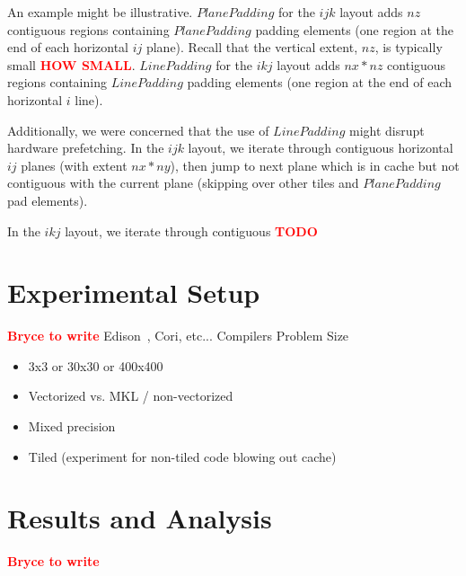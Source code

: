 \documentclass[conference]{IEEEtran}
\newcommand{\fix}[1]{{\bf \textcolor {red}{#1}}}
\begin{document}
An example might be illustrative. \(PlanePadding\) for the \(ijk\) layout adds
\(nz\) contiguous regions containing \(PlanePadding\) padding elements (one region
at the end of each horizontal \(ij\) plane). Recall that the vertical extent, \(nz\), 
is typically small \fix{HOW SMALL}. \(LinePadding\) for the \(ikj\) layout adds
\(nx*nz\) contiguous regions containing \(LinePadding\) padding elements (one region
at the end of each horizontal \(i\) line).

Additionally, we were concerned that the use of \(LinePadding\) might disrupt
hardware prefetching. In the \(ijk\) layout, we iterate through contiguous
horizontal \(ij\) planes (with extent \(nx*ny\)), then jump to next plane which
is in cache but not contiguous with the current plane (skipping over other
tiles and \(PlanePadding\) pad elements).

In the \(ikj\) layout, we iterate through contiguous \fix{TODO}






\section{Experimental Setup}
\fix{Bryce to write}
Edison~\cite{Edison_website}, Cori, etc...
Compilers
Problem Size


\begin{itemize}
\item 3x3 or 30x30 or 400x400
\item Vectorized vs. MKL / non-vectorized
\item Mixed precision
\item Tiled (experiment for non-tiled code blowing out cache)
\end{itemize}

\section{Results and Analysis}
\fix{Bryce to write}
\end{document}
